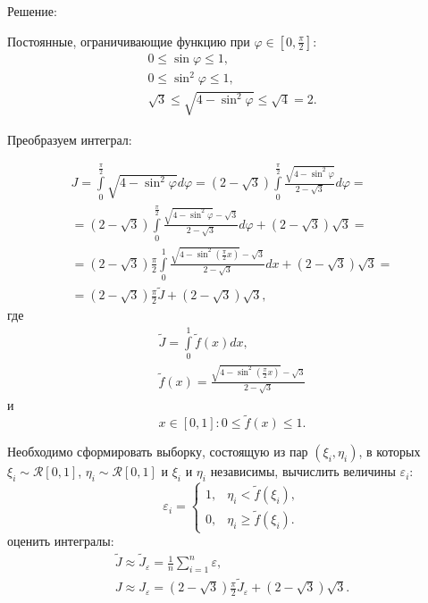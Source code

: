 \documentclass[a4paper,12pt]{article}
\begin{document}
Решение:

Постоянные, ограничивающие функцию при $\varphi \in \left[ 0, \frac{\pi}{2} \right]$:
\begin{gather*}
    0 \le \sin \varphi \le 1 , \\
    0 \le \sin^2 \varphi \le 1 , \\
    \sqrt{3} \le \sqrt{4 - \sin^2 \varphi} \le \sqrt{4} = 2 .
\end{gather*}

Преобразуем интеграл:

\begin{multline*}
    J
    = \int \limits_0^{\frac{\pi}{2}} \sqrt{4 - \sin^2 \varphi} d \varphi
    = \left( 2 - \sqrt{3} \right) \int \limits_0^{\frac{\pi}{2}} \frac{\sqrt{4 - \sin^2 \varphi}}{2 - \sqrt{3}} d \varphi = \\
    = \left( 2 - \sqrt{3} \right) \int \limits_0^{\frac{\pi}{2}} \frac{\sqrt{4 - \sin^2 \varphi} - \sqrt{3}}{2 - \sqrt{3}} d \varphi + \left( 2 - \sqrt{3} \right) \sqrt{3} = \\
    = \left( 2 - \sqrt{3} \right) \frac{\pi}{2} \int \limits_0^1 \frac{\sqrt{4 - \sin^2 \left( \frac{\pi}{2} x \right)} - \sqrt{3}}{2 - \sqrt{3}} d x + \left( 2 - \sqrt{3} \right) \sqrt{3} = \\
    = \left( 2 - \sqrt{3} \right) \frac{\pi}{2} \widetilde{J} + \left( 2 - \sqrt{3} \right) \sqrt{3} ,
\end{multline*}
где
\begin{gather*}
    \widetilde{J} = \int \limits_0^1 \widetilde{f}(x) d x , \\
    \widetilde{f}(x) = \frac{\sqrt{4 - \sin^2 \left( \frac{\pi}{2} x \right)} - \sqrt{3}}{2 - \sqrt{3}}
\end{gather*}
и
\[
    x \in [0, 1]: 0 \le \widetilde{f}(x) \le 1 .
\]

Необходимо сформировать выборку, состоящую из пар $(\xi_i, \eta_i)$, в которых $\xi_i \sim \mathcal{R}[0, 1]$, $\eta_i \sim \mathcal{R}[0, 1]$ и
$\xi_i$ и $\eta_i$ независимы, вычислить величины $\varepsilon_i$:
\[
    \varepsilon_i
    = \left \{
    \begin{array}{ll}
        1, & \eta_i < \widetilde{f}(\xi_i) ,   \\
        0, & \eta_i \ge \widetilde{f}(\xi_i) .
    \end{array}
    \right .
\]
оценить интегралы:
\begin{gather*}
    \widetilde{J} \approx \widetilde{J}_\varepsilon = \frac{1}{n} \sum_{i=1}^n \varepsilon , \\
    J \approx J_\varepsilon = \left( 2 - \sqrt{3} \right) \frac{\pi}{2} \widetilde{J}_\varepsilon + \left( 2 - \sqrt{3} \right) \sqrt{3} .
\end{gather*}
\end{document}

